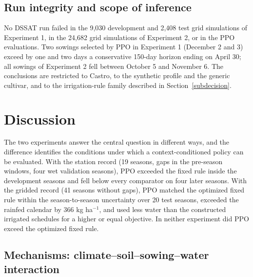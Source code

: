 \documentclass[times,final,authoryear]{elsarticle}
\begin{document}
\subsection{Run integrity and scope of inference}
\label{subres_generalization}

No DSSAT run failed in the 9,030 development and 2,408 test grid simulations of Experiment 1, in the 24,682 grid simulations of Experiment 2, or in the PPO evaluations. Two sowings selected by PPO in Experiment 1 (December 2 and 3) exceed by one and two days a conservative 150-day horizon ending on April 30; all sowings of Experiment 2 fell between October 5 and November 6. The conclusions are restricted to Castro, to the synthetic profile and the generic cultivar, and to the irrigation-rule family described in Section~\ref{subdecision}.

\section{Discussion}
\label{discussao}

The two experiments answer the central question in different ways, and the difference identifies the conditions under which a context-conditioned policy can be evaluated. With the station record (19 seasons, gaps in the pre-season windows, four wet validation seasons), PPO exceeded the fixed rule inside the development seasons and fell below every comparator on four later seasons. With the gridded record (41 seasons without gaps), PPO matched the optimized fixed rule within the season-to-season uncertainty over 20 test seasons, exceeded the rainfed calendar by 366 kg ha$^{-1}$, and used less water than the constructed irrigated schedules for a higher or equal objective. In neither experiment did PPO exceed the optimized fixed rule.

\subsection{Mechanisms: climate--soil--sowing--water interaction}
\label{subdisc_mechanisms}
\end{document}
